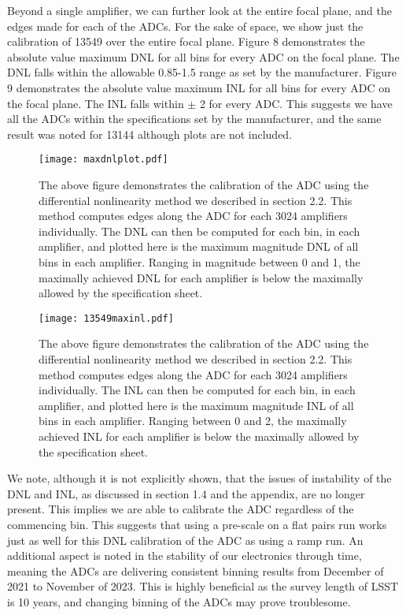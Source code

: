 \documentclass[11pt, letterpaper]{article}
\begin{document}
Beyond a single amplifier, we can further look at the entire focal plane, and the edges made for each of the ADCs. 
For the sake of space, we show just the calibration of 13549 over the entire focal plane. 
Figure 8 demonstrates the absolute value maximum DNL for all bins for every ADC on the focal plane. 
The DNL falls within the allowable 0.85-1.5 range as set by the manufacturer.  
Figure 9 demonstrates the absolute value maximum INL for all bins for every ADC on the focal plane. 
The INL falls within $\pm$ 2 for every ADC. 
This suggests we have all the ADCs within the specifications set by the manufacturer, and the same result was noted for 13144 although plots are not included. 
\begin{figure}
	\texttt{[image: maxdnlplot.pdf]}
	\caption{The above figure demonstrates the calibration of the ADC using the differential nonlinearity method we described in section 2.2. This method computes edges along the ADC for each 3024 amplifiers individually. The DNL can then be computed for each bin, in each amplifier, and plotted here is the maximum magnitude DNL of all bins in each amplifier. Ranging in magnitude between 0 and 1, the maximally achieved DNL for each amplifier is below the maximally allowed by the specification sheet. }
\end{figure}
\begin{figure}
	\texttt{[image: 13549maxinl.pdf]}
	\caption{The above figure demonstrates the calibration of the ADC using the differential nonlinearity method we described in section 2.2. This method computes edges along the ADC for each 3024 amplifiers individually. The INL can then be computed for each bin, in each amplifier, and plotted here is the maximum magnitude INL of all bins in each amplifier. Ranging between 0 and 2, the maximally achieved INL for each amplifier is below the maximally allowed by the specification sheet.}
\end{figure}
\indent


We note, although it is not explicitly shown, that the issues of instability of the DNL and INL, as discussed in section 1.4 and the appendix, are no longer present. 
This implies we are able to calibrate the ADC regardless of the commencing bin. 
This suggests that using a pre-scale on a flat pairs run works just as well for this DNL calibration of the ADC as using a ramp run. 
An additional aspect is noted in the stability of our electronics through time, meaning the ADCs are delivering consistent binning results from December of 2021 to November of 2023. 
This is highly beneficial as the survey length of LSST is 10 years, and changing binning of the ADCs may prove troublesome. 
\end{document}
